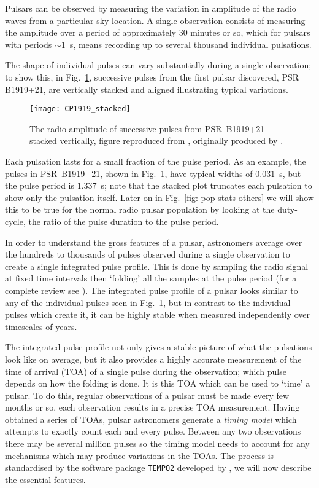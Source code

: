 Pulsars can be observed by measuring the variation in amplitude of the radio
waves from a particular sky location. A single observation consists of measuring
the amplitude over a period of approximately $30$ minutes or so, which for pulsars
with periods $\sim 1$~s, means recording up to several thousand individual pulsations.

The shape of individual pulses can vary substantially during a single
observation; to show this, in Fig.~\ref{fig: CP1919 stacked}, successive pulses
from the first pulsar discovered, PSR B1919+21, are vertically stacked and
aligned illustrating typical variations.
\begin{figure}[htb]
\centering
\texttt{[image: CP1919\_stacked]}
\caption{The radio amplitude of successive pulses from PSR~B1919+21 stacked
vertically, figure reproduced from \citet{mitton1977cambridge}, originally
produced by \citet{craft1970}.}
\label{fig: CP1919 stacked}
\end{figure}
Each pulsation lasts for a small fraction of the pulse period. As an example,
the pulses in PSR~B1919+21, shown in Fig.~\ref{fig: CP1919 stacked}, have
typical widths of $0.031$~s, but the pulse period is $1.337$~s; note that the
stacked plot truncates each pulsation to show only the pulsation itself. Later
on in Fig.~\ref{fig: pop stats others} we will show this to be true for the
normal radio pulsar population by looking at the duty-cycle, the ratio of the
pulse duration to the pulse period.

In order to understand the gross features of a pulsar, astronomers average over
the hundreds to thousands of pulses observed during a single observation to
create a single integrated pulse profile. This is done by sampling the radio
signal at fixed time intervals then `folding' all the samples at the pulse
period (for a complete review see \citet{Lyne2012book}). The integrated pulse
profile of a pulsar looks similar to any of the individual pulses seen in
Fig.~\ref{fig: CP1919 stacked}, but in contrast to the individual pulses which
create it, it can be highly stable when measured independently over timescales
of years.

The integrated pulse profile not only gives a stable picture of what the
pulsations look like on average, but it also provides a highly accurate
measurement of the time of arrival (TOA) of a single pulse during the
observation; which pulse depends on how the folding is done. It is this TOA
which can be used to `time' a pulsar. To do this, regular observations of a
pulsar must be made every few months or so, each observation results in a
precise TOA measurement. Having obtained a series of TOAs, pulsar astronomers
generate a \emph{timing model} which attempts to exactly count each and every
pulse. Between any two observations there may be several million pulses so the
timing model needs to account for any mechanisms which may produce variations
in the TOAs.  The process is standardised by the software package
\texttt{TEMPO2} developed by \citet{Hobbs2006}, we will now describe the
essential features.


